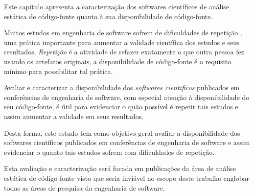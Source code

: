 {Este capítulo apresenta a caracterização dos softwares científicos de análise
estática de código-fonte quanto à sua disponibilidade de código-fonte.}
\label{caracterizacao-ferramentas}

Muitos estudos em engenharia de software sofrem de dificuldades de repetição
\cite{Tang2016}, uma prática importante para aumentar a validade científica dos
estudos e seus resultados. {\it Repetição} é a atividade de refazer exatamente
o que outra pessoa fez usando os artefatos originais, a disponibilidade de
código-fonte é o requisito mínimo para possibilitar tal prática.

Avaliar e caracterizar a disponibilidade dos {\it softwares cientificos}
publicados em conferências de engenharia de software, com especial atenção à
disponibilidade do seu código-fonte, é útil para evidenciar o quão possível é
repetir tais estudos e assim aumentar a validade em seus resultados.

Desta forma, este estudo tem como objetivo geral avaliar a disponibilidade dos
softwares científicos publicados em conferências de engenharia de software e
assim evidenciar o quanto tais estudos sofrem com dificuldades de repetição.

Esta avaliação e caracterização será focada em publicações da área de análise
estática de código-fonte visto que seria inviável no escopo deste trabalho
englobar todas as áreas de pesquisa da engenharia de software.



%


